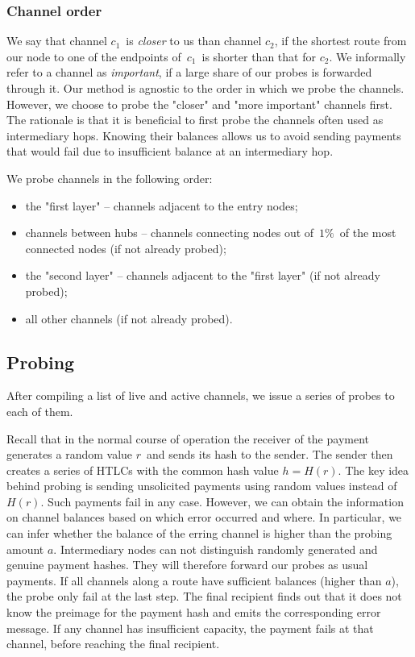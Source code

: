 \subsubsection*{Channel order}
We say that channel $c_1$~is \textit{closer} to us than channel $c_2$, if the shortest route from our node to one of the endpoints of~$c_1$~is shorter than that for $c_2$.
We informally refer to a channel as \textit{important}, if a large share of our probes is forwarded through it.
Our method is agnostic to the order in which we probe the channels.
However, we choose to probe the "closer" and "more important" channels first.
The rationale is that it is beneficial to first probe the channels often used as intermediary hops.
Knowing their balances allows us to avoid sending payments that would fail due to insufficient balance at an intermediary hop.

We probe channels in the following order:

\begin{itemize}
	\item the "first layer" -- channels adjacent to the entry nodes;
	\item channels between hubs -- channels connecting nodes out of~$1\%$~of the most connected nodes (if not already probed);
	\item the "second layer" -- channels adjacent to the "first layer" (if not already probed);
	\item all other channels (if not already probed).
\end{itemize}


\subsection{Probing}

After compiling a list of live and active channels, we issue a series of probes to each of them.

Recall that in the normal course of operation the receiver of the payment generates a random value $r$~and sends its hash to the sender.
The sender then creates a series of HTLCs with the common hash value $h = H(r)$.
The key idea behind probing is sending unsolicited payments using random values instead of~$H(r)$.
Such payments fail in any case.
However, we can obtain the information on channel balances based on which error occurred and where.
In particular, we can infer whether the balance of the erring channel is higher than the probing amount $a$.
Intermediary nodes can not distinguish randomly generated and genuine payment hashes.
They will therefore forward our probes as usual payments.
If all channels along a route have sufficient balances (higher than $a$), the probe only fail at the last step.
The final recipient finds out that it does not know the preimage for the payment hash and emits the corresponding error message.
If any channel has insufficient capacity, the payment fails at that channel, before reaching the final recipient.

